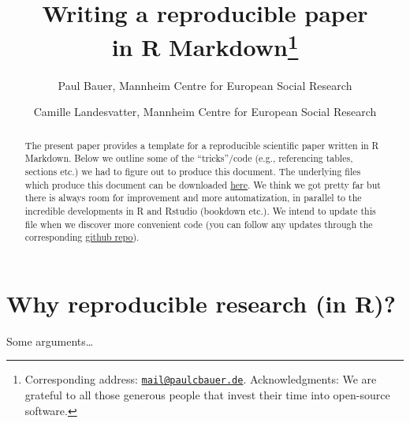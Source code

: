 \documentclass[
  12pt,
]{article}
\title{\hfill\break
\hfill\break
\vspace{1cm}Writing a reproducible paper\\
in R Markdown\footnote{Corresponding address: \href{mailto:mail@paulcbauer.de}{\nolinkurl{mail@paulcbauer.de}}. Acknowledgments: We are grateful to all those generous people that invest their time into open-source software.}\vspace{0.5cm}\\}
\author{Paul Bauer, Mannheim Centre for European Social Research \and Camille Landesvatter, Mannheim Centre for European Social Research}
\date{\hfill\break
First version: December 14, 2018\\
This version: March 08, 2023\\
Download: \url{https://osf.io/q395s}\\
\strut \\
Feedback? Errors? \href{mailto:mail@paulcbauer.eu}{\nolinkurl{mail@paulcbauer.eu}}\\
\href{https://github.com/paulcbauer/Writing_a_reproducable_paper_in_rmarkdown/}{Github repository}\\
\strut \\
Tired of Latex?\\
Try \href{https://github.com/rstudio/pagedown}{Pagedown} with our \href{https://osf.io/k8jhx/}{new template}! :-)}
\begin{document}
\maketitle
\begin{abstract}
\noindent{}The present paper provides a template for a reproducible scientific paper written in R Markdown. Below we outline some of the ``tricks''/code (e.g., referencing tables, sections etc.) we had to figure out to produce this document. The underlying files which produce this document can be downloaded \href{https://drive.google.com/drive/folders/1zJP3cNPrHN-gj0rcmbHQgg-XA0hqDXdd?usp=sharing}{here}. We think we got pretty far but there is always room for improvement and more automatization, in parallel to the incredible developments in R and Rstudio (bookdown etc.). We intend to update this file when we discover more convenient code (you can follow any updates through the corresponding \href{https://github.com/paulcbauer/Writing_a_reproducable_paper_in_rmarkdown/}{github repo}).\vspace{.8cm}
\end{abstract}

\clearpage

\renewcommand{\baselinestretch}{0.5}\normalsize
\tableofcontents
\renewcommand{\baselinestretch}{1.1}\normalsize

\clearpage

\hypertarget{why-reproducible-research-in-r}{%
\section{Why reproducible research (in R)?}\label{why-reproducible-research-in-r}}

Some arguments\ldots{}
\end{document}

